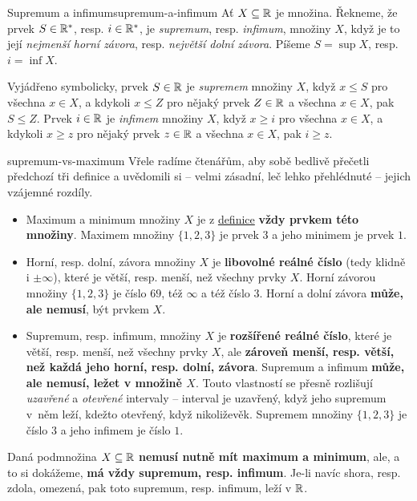 \begin{definition}{Supremum a infimum}{supremum-a-infimum}
 Ať $X \subseteq \mathbb{R}$ je množina. Řekneme, že prvek $S \in \mathbb{R}^{*}$, resp. $i \in
 \mathbb{R}^{*}$, je \emph{supremum}, resp. \emph{infimum}, množiny $X$, když je to její
 \emph{nejmenší horní závora}, resp. \emph{největší dolní závora}. Píšeme $S =
 \sup X$, resp. $i = \inf X$.

 Vyjádřeno symbolicky, prvek $S \in \mathbb{R}$ je \emph{supremem} množiny $X$, když $x
 \leq S$ pro všechna $x \in X$, a kdykoli $x \leq Z$ pro nějaký prvek $Z \in \mathbb{R}$
 a všechna $x \in X$, pak $S \leq Z$. Prvek $i \in \mathbb{R}$ je \emph{infimem} množiny
 $X$, když $x \geq i$ pro všechna $x \in X$, a kdykoli $x \geq z$ pro nějaký
 prvek $z \in \mathbb{R}$ a všechna $x \in X$, pak $i \geq z$.
\end{definition}

\begin{warning}[topsep at break=0pt]{}{supremum-vs-maximum}
 Vřele radíme čtenářům, aby sobě bedlivě přečetli předchozí tři definice a
 uvědomili si -- velmi zásadní, leč lehko přehlédnuté -- jejich vzájemné
 rozdíly.
 \begin{itemize}
  \item Maximum a minimum množiny $X$ je z
   \hyperref[def:maximum-a-minimum]{definice} \textbf{vždy prvkem této množiny}.
   Maximem množiny $\{1,2,3\}$ je prvek $3$ a jeho minimem je prvek $1$.
  \item Horní, resp. dolní, závora množiny $X$ je \textbf{libovolné
    reálné číslo} (tedy klidně i $ \pm \infty$), které je větší,
   resp. menší, než všechny prvky $X$. Horní závorou množiny $\{1,2,3\}$ je
   číslo $69$, též $\infty$ a též číslo $3$. Horní a dolní závora \textbf{může,
   ale nemusí}, být prvkem $X$.
  \item Supremum, resp. infimum, množiny $X$ je \textbf{rozšířené reálné číslo},
   které je větší, resp. menší, než všechny prvky $X$, ale \textbf{zároveň
   menší, resp. větší, než každá jeho horní, resp. dolní, závora}. Supremum a
   infimum \textbf{může, ale nemusí, ležet v množině $X$}. Touto vlastností se
   přesně rozlišují \emph{uzavřené} a \emph{otevřené} intervaly -- interval je
   uzavřený, když jeho supremum v~něm leží, kdežto otevřený, když nikoliževěk.
   Supremem množiny $\{1,2,3\}$ je číslo $3$ a jeho infimem je číslo $1$.
 \end{itemize}
 Daná podmnožina $X \subseteq \mathbb{R}$ \textbf{nemusí nutně mít maximum a minimum},
 ale, a to si dokážeme, \textbf{má vždy supremum, resp. infimum}. Je-li navíc
 shora, resp. zdola, omezená, pak toto supremum, resp. infimum, leží v $\mathbb{R}$.
\end{warning}

